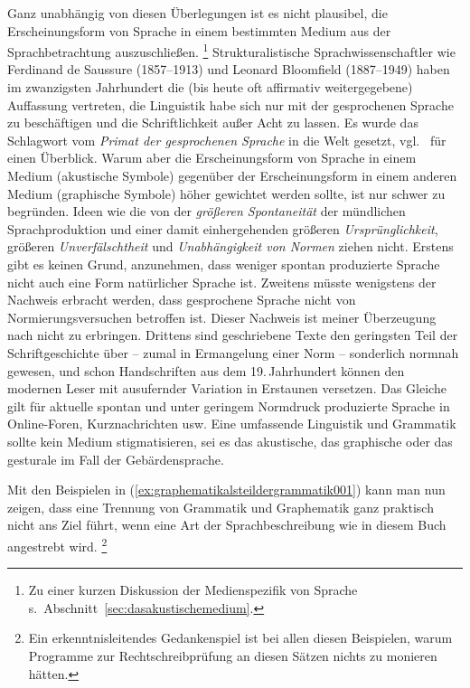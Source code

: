 Ganz unabhängig von diesen Überlegungen ist es nicht plausibel, die Erscheinungsform von Sprache in einem bestimmten Medium aus der Sprachbetrachtung auszuschließen.%
\footnote{Zu einer kurzen Diskussion der Medienspezifik von Sprache s.\ Abschnitt~\ref{sec:dasakustischemedium}.}
Strukturalistische Sprachwissenschaftler wie Ferdinand de Saussure (1857--1913) und Leonard Bloomfield (1887--1949) haben im zwanzigsten Jahrhundert die (bis heute oft affirmativ weitergegebene) Auffassung vertreten, die Linguistik habe sich nur mit der gesprochenen Sprache zu beschäftigen und die Schriftlichkeit außer Acht zu lassen.
Es wurde das Schlagwort vom \textit{Primat der gesprochenen Sprache} in die Welt gesetzt, vgl.\ \cite[Kapitel~0]{Duerscheid2012a} für einen Überblick.
Warum aber die Erscheinungsform von Sprache in einem Medium (akustische Symbole) gegenüber der Erscheinungsform in einem anderen Medium (graphische Symbole) höher gewichtet werden sollte, ist nur schwer zu begründen.
Ideen wie die von der \textit{größeren Spontaneität} der mündlichen Sprachproduktion und einer damit einhergehenden größeren \textit{Ursprünglichkeit}, größeren \textit{Unverfälschtheit} und \textit{Unabhängigkeit von Normen} ziehen nicht.
Erstens gibt es keinen Grund, anzunehmen, dass weniger spontan produzierte Sprache nicht auch eine Form natürlicher Sprache ist.
Zweitens müsste wenigstens der Nachweis erbracht werden, dass gesprochene Sprache nicht von Normierungsversuchen betroffen ist.
Dieser Nachweis ist meiner Überzeugung nach nicht zu erbringen.
Drittens sind geschriebene Texte den geringsten Teil der Schriftgeschichte über -- zumal in Ermangelung einer Norm -- sonderlich normnah gewesen, und schon Handschriften aus dem 19.\,Jahrhundert können den modernen Leser mit ausufernder Variation in Erstaunen versetzen.
Das Gleiche gilt für aktuelle spontan und unter geringem Normdruck produzierte Sprache in Online-Foren, Kurznachrichten usw.
Eine umfassende Linguistik und Grammatik sollte kein Medium stigmatisieren, sei es das akustische, das graphische oder \zB das gesturale im Fall der Gebärdensprache.

Mit den Beispielen in (\ref{ex:graphematikalsteildergrammatik001}) kann man nun zeigen, dass eine Trennung von Grammatik und Graphematik ganz praktisch nicht ans Ziel führt, wenn eine Art der Sprachbeschreibung wie in diesem Buch angestrebt wird.%
\footnote{Ein erkenntnisleitendes Gedankenspiel ist bei allen diesen Beispielen, warum Programme zur Rechtschreibprüfung an diesen Sätzen nichts zu monieren hätten.}

